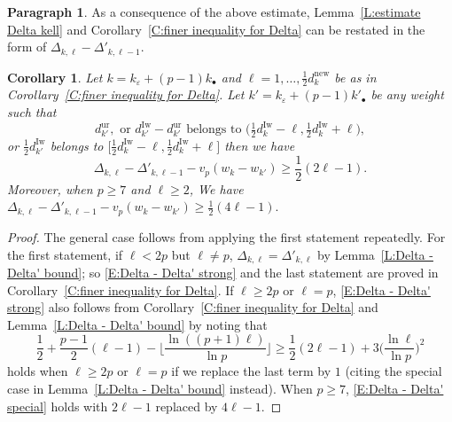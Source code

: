 \documentclass[12pt]{amsart}
\newtheorem{corollary}[subsection]{Corollary}
\theoremstyle{definition}
\newtheorem{para}[subsection]{Paragraph}
\numberwithin{equation}{subsection}
\newcommand{\new}{\mathrm{new}}
\newcommand{\Iw}{\mathrm{Iw}}
\newcommand{\ur}{\mathrm{ur}}
\begin{document}
\begin{para}
\label{P:para_157}
As a consequence of the above estimate, Lemma~\ref{L:estimate Delta kell} and Corollary~\ref{C:finer inequality for Delta} can be restated in the form of $\Delta_{k, \ell}- \Delta'_{k, \ell-1}$.
\end{para}
\begin{corollary}
\label{C:Delta - Delta'}
Let $k=k_\varepsilon + (p-1)k_\bullet $ and $\ell = 1, \dots, \frac 12d_k^\new$ be as in Corollary~\ref{C:finer inequality for Delta}. Let $k' = k_\varepsilon + (p-1)k'_\bullet$ be any weight such that 
$$
d_{k'}^\ur, \textrm{ or } d_{k'}^\Iw - d_{k'}^\ur \textrm{ belongs to } \big(\tfrac 12d_k^\Iw-\ell, \tfrac 12 d_k^\Iw+\ell\big),
$$
or $\tfrac 12 d_{k'}^\Iw$ belongs to $\big[\tfrac 12d_k^\Iw-\ell, \tfrac 12 d_k^\Iw+\ell\big]$
then we have
\begin{equation}
\label{E:Delta - Delta' strong}
\Delta_{k, \ell} - \Delta'_{k,\ell-1} -v_p(w_{k} - w_{k'}) \geq \frac 12 (2\ell-1).
\end{equation}
Moreover, when $p \geq 7$ and $\ell \geq 2$, We have $\Delta_{k, \ell}-\Delta'_{k, \ell-1} -v_p(w_{k} - w_{k'}) \geq \frac 12 (4\ell-1).$
\end{corollary}
\begin{proof}
The general case follows from applying the first statement repeatedly. For the first statement, if $\ell < 2p$ but $\ell \neq p$, $\Delta_{k, \ell} = \Delta'_{k, \ell}$ by Lemma~\ref{L:Delta - Delta' bound}; so \eqref{E:Delta - Delta' strong} and the last statement are proved in Corollary~\ref{C:finer inequality for Delta}.
If $\ell \geq 2p$ or $\ell =p$, \eqref{E:Delta - Delta' strong} also follows from Corollary~\ref{C:finer inequality for Delta} and Lemma~\ref{L:Delta - Delta' bound} by noting that
\begin{equation}
\label{E:Delta - Delta' special}
\frac 12+
\frac{p-1}2(\ell-1) -\Big \lfloor \frac{\ln((p+1) \ell)}{\ln p}\Big\rfloor  \geq \frac 12(2\ell-1) +3 \Big( \frac{\ln \ell }{\ln p}\Big)^2
\end{equation}
holds when $\ell \geq 2p$ or $\ell = p$ if we replace the last term by $1$ (citing the special case in Lemma~\ref{L:Delta - Delta' bound} instead). When $p \geq 7$, \eqref{E:Delta - Delta' special} holds with $2\ell-1$ replaced by $4 \ell -1$.
\end{proof}
\end{document}

